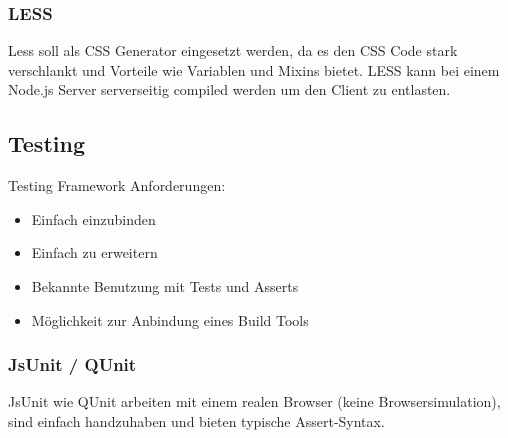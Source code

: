 			\subsubsection{LESS}
				Less soll als CSS Generator eingesetzt werden, da es den CSS Code stark verschlankt und Vorteile wie Variablen und Mixins bietet. LESS kann bei einem Node.js Server serverseitig compiled werden um den Client zu entlasten.
				
		\subsection{Testing}
			Testing Framework Anforderungen:
			\begin{itemize}
				\item Einfach einzubinden
				\item Einfach zu erweitern
				\item Bekannte Benutzung mit Tests und Asserts
				\item Möglichkeit zur Anbindung eines Build Tools
			\end{itemize}

			\subsubsection{JsUnit / QUnit}
				JsUnit wie QUnit arbeiten mit einem realen Browser (keine Browsersimulation), 
				sind einfach handzuhaben und bieten typische Assert-Syntax.
				
				
